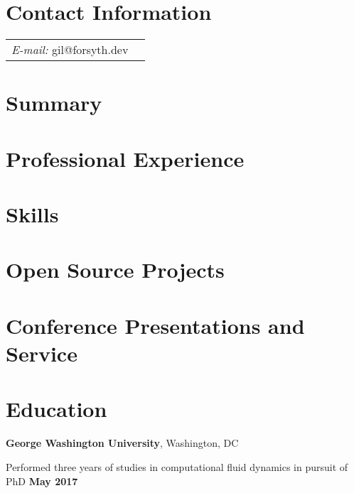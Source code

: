 \documentclass[margin,line]{res}
\newenvironment{list1}{
  \begin{list}{\ding{113}}{%
      \setlength{\itemsep}{0in}
      \setlength{\parsep}{0in} \setlength{\parskip}{0in}
      \setlength{\topsep}{0in} \setlength{\partopsep}{0in}
      \setlength{\leftmargin}{0.17in}}}{\end{list}}
\begin{document}
\newcommand{\link}[1]{\texttt{#1}}
\providecommand{\tightlist}{%
      \setlength{\itemsep}{0pt}\setlength{\parskip}{0pt}}


\renewcommand{\labelitemi}{\ding{226}}


\begin{resume}
\section{\sc Contact Information}
\vspace{.05in}
\begin{tabular}{@{}p{2in}p{4in}}
{\it E-mail:}  gil@forsyth.dev
\end{tabular}


\section{\sc Summary}



\section{\sc Professional Experience}



\section{\sc Skills}




\section{\sc Open Source Projects}



\section{\sc Conference Presentations and Service}



\section{\sc Education}
\textbf {George Washington University}, Washington, DC\\
\vspace*{-.1in}
\begin{list1}
\item[] Performed three years of studies in computational fluid dynamics in pursuit of PhD \hfill \textbf{ May 2017}
\end{list1}


\end{resume}
\end{document}
